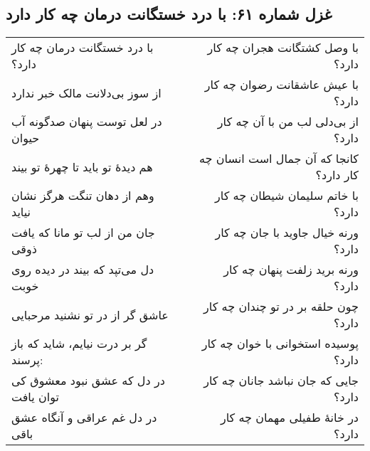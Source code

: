 \begin{center}
\section*{غزل شماره ۶۱: با درد خستگانت درمان چه کار دارد}
\label{sec:061}
\begin{longtable}{l p{0.5cm} r}
با درد خستگانت درمان چه کار دارد؟
&&
با وصل کشتگانت هجران چه کار دارد؟
\\
از سوز بی‌دلانت مالک خبر ندارد
&&
با عیش عاشقانت رضوان چه کار دارد؟
\\
در لعل توست پنهان صدگونه آب حیوان
&&
از بی‌دلی لب من با آن چه کار دارد؟
\\
هم دیدهٔ تو باید تا چهرهٔ تو بیند
&&
کانجا که آن جمال است انسان چه کار دارد؟
\\
وهم از دهان تنگت هرگز نشان نیاید
&&
با خاتم سلیمان شیطان چه کار دارد؟
\\
جان من از لب تو مانا که یافت ذوقی
&&
ورنه خیال جاوید با جان چه کار دارد؟
\\
دل می‌تپد که بیند در دیده روی خوبت
&&
ورنه برید زلفت پنهان چه کار دارد؟
\\
عاشق گر از در تو نشنید مرحبایی
&&
چون حلقه بر در تو چندان چه کار دارد؟
\\
گر بر درت نیایم، شاید که باز پرسند:
&&
پوسیده استخوانی با خوان چه کار دارد؟
\\
در دل که عشق نبود معشوق کی توان یافت
&&
جایی که جان نباشد جانان چه کار دارد؟
\\
در دل غم عراقی و آنگاه عشق باقی
&&
در خانهٔ طفیلی مهمان چه کار دارد؟
\\
\end{longtable}
\end{center}
